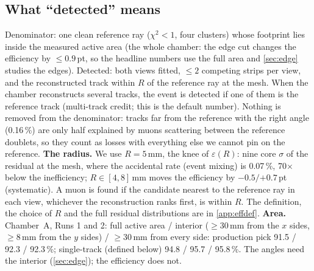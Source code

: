 \subsection{What ``detected'' means}\label{sec:detected}
Denominator: one clean reference ray ($\chi^2<1$, four clusters) whose footprint lies inside the measured active area
(the whole chamber: the edge cut changes the efficiency by ${\le}0.9$\,pt, so the headline numbers use the full area
and \cref{sec:edge} studies the edges). Detected: both views fitted, ${\le}2$ competing strips per view, and the
reconstructed track within $R$ of the reference ray at the mesh. When the chamber reconstructs several tracks, the event is
detected if one of them is the reference track (multi-track credit; this is the default number). Nothing is removed from the denominator: tracks far from the reference with the right angle (0.16\,\%) are only half
explained by muons scattering between the reference doublets, so they count as losses with everything else we cannot pin on
the reference.
\textbf{The radius.} We use $R=5$\,mm, the knee of $\varepsilon(R)$: nine core $\sigma$ of the residual at the mesh,
where the accidental rate (event mixing) is 0.07\,\%, 70$\times$ below the inefficiency; $R\in[4,8]$\,mm moves the
efficiency by $-0.5/{+0.7}$\,pt (systematic). A muon is found if the candidate nearest to the reference ray in each view,
whichever the reconstruction ranks first, is within $R$. The definition, the choice of $R$ and the full residual
distributions are in \cref{app:effdef}.
\textbf{Area.} Chamber~A, Runs 1 and 2: full active area / interior (${\ge}30$\,mm from the $x$ sides, ${\ge}8$\,mm from
the $y$ sides) / ${\ge}30$\,mm from every side: production pick 91.5 / 92.3 / 92.3\,\%; single-track (defined below) 94.8 / 95.7 /
95.8\,\%. The angles need the interior (\cref{sec:edge}); the efficiency does not.

